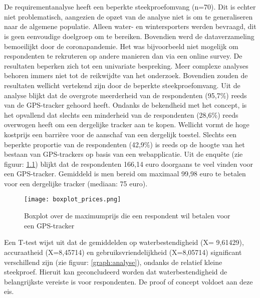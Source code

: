 \chapter{}
\label{ch:resultaten}
\section{}
De requirementanalyse heeft een beperkte steekproefomvang (n=70). Dit is echter niet problematisch, aangezien de opzet van de analyse niet is om te generaliseren naar de algemene populatie. Alleen water- en wintersporters werden bevraagd, dit is geen eenvoudige doelgroep om te bereiken. Bovendien werd de dataverzameling bemoeilijkt door de coronapandemie. Het was bijvoorbeeld niet mogelijk om respondenten te rekruteren op andere manieren dan via een online survey. De resultaten beperken zich tot een univariate bespreking. Meer complexe analyses behoren immers niet tot de reikwijdte van het onderzoek. Bovendien zouden de resultaten wellicht vertekend zijn door de beperkte steekproefomvang. Uit de analyse blijkt dat de overgrote meerderheid van de respondenten (95,7\%) reeds van de GPS-tracker gehoord heeft. Ondanks de bekendheid met het concept, is het opvallend dat slechts een minderheid van de respondenten (28,6\%) reeds overwogen heeft om een dergelijke tracker aan te kopen. Wellicht vormt de hoge kostprijs een barrière voor de aanschaf van een dergelijk toestel. Slechts een beperkte proportie van de respondenten (42,9\%) is reeds op de hoogte van het bestaan van GPS-trackers op basis van een webapplicatie. Uit de enquête (zie figuur: \ref{graph:price}) blijkt dat de respondenten 166,14 euro doorgaans te veel vinden voor een GPS-tracker. Gemiddeld is men bereid om maximaal 99,98 euro te betalen voor een dergelijke tracker (mediaan: 75 euro).
\newline
\begin{figure}
	\texttt{[image: boxplot\_prices.png]}
	\caption[Boxplot maximum prijs]{Boxplot over de maximumprijs die een respondent wil betalen voor een GPS-tracker}
	\label{graph:price}
\end{figure}
Een T-test wijst uit dat de gemiddelden op waterbestendigheid (X= 9,61429), accuraatheid (X=8,45714) en gebruiksvriendelijkheid (X=8,05714) significant verschillend zijn (zie figuur: \ref{graph:analyse}), ondanks de relatief kleine steekproef. Hieruit kan geconcludeerd worden dat waterbestendigheid de belangrijkste vereiste is voor respondenten. De proof of concept voldoet aan deze eis.
